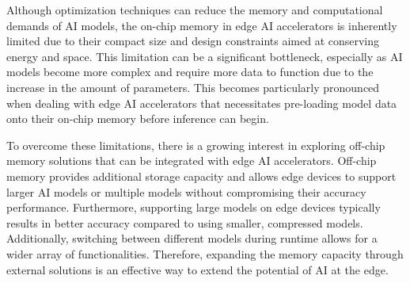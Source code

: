 Although optimization techniques can reduce the memory and computational demands of AI models, the on-chip memory in edge AI accelerators is inherently limited due to their compact size and design constraints aimed at conserving energy and space.
This limitation can be a significant bottleneck, especially as AI models become more complex and require more data to function due to the increase in the amount of parameters.
This becomes particularly pronounced when dealing with edge AI accelerators that necessitates pre-loading model data onto their on-chip memory before inference can begin.

To overcome these limitations, there is a growing interest in exploring off-chip memory solutions that can be integrated with edge AI accelerators.
Off-chip memory provides additional storage capacity and allows edge devices to support larger AI models or multiple models without compromising their accuracy performance.
Furthermore, supporting large models on edge devices typically results in better accuracy compared to using smaller, compressed models.
Additionally, switching between different models during runtime allows for a wider array of functionalities.
Therefore, expanding the memory capacity through external solutions is an effective way to extend the potential of AI at the edge.
